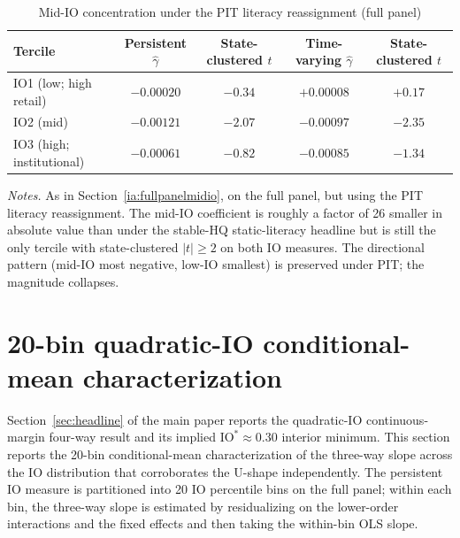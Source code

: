 \documentclass[12pt]{article}
\begin{document}
\begin{table}[h]
\centering
\caption{Mid-IO concentration under the PIT literacy reassignment (full panel)}
\footnotesize
\begin{tabular}{lcccc}
\toprule
Tercile & Persistent $\hat\gamma$ & State-clustered $t$ & Time-varying $\hat\gamma$ & State-clustered $t$ \\
\midrule
IO1 (low; high retail)        & $-0.00020$ & $-0.34$ & $+0.00008$ & $+0.17$ \\
IO2 (mid)                     & $-0.00121$ & $-2.07$ & $-0.00097$ & $-2.35$ \\
IO3 (high; institutional)     & $-0.00061$ & $-0.82$ & $-0.00085$ & $-1.34$ \\
\bottomrule
\end{tabular}

\medskip
{\footnotesize\textit{Notes.} As in Section~\ref{ia:fullpanelmidio}, on the full panel, but using the PIT literacy reassignment. The mid-IO coefficient is roughly a factor of 26 smaller in absolute value than under the stable-HQ static-literacy headline but is still the only tercile with state-clustered $|t| \geq 2$ on both IO measures. The directional pattern (mid-IO most negative, low-IO smallest) is preserved under PIT; the magnitude collapses.}
\end{table}

\section{20-bin quadratic-IO conditional-mean characterization}
\label{ia:quadbins}

Section~\ref{sec:headline} of the main paper reports the quadratic-IO continuous-margin four-way result and its implied $\mathrm{IO}^* \approx 0.30$ interior minimum. This section reports the 20-bin conditional-mean characterization of the three-way slope across the IO distribution that corroborates the U-shape independently. The persistent IO measure is partitioned into 20 IO percentile bins on the full panel; within each bin, the three-way slope is estimated by residualizing on the lower-order interactions and the fixed effects and then taking the within-bin OLS slope.
\end{document}

